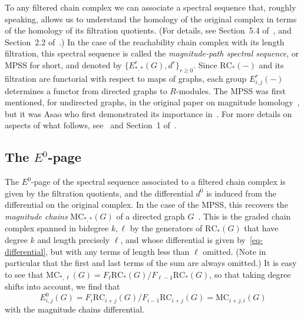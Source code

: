 \documentclass[a4paper, 11 pt, oneside, reqno]{amsart}
\numberwithin{lemma}{section}
\theoremstyle{definition}
\newcommand{\RC}{\mathrm{RC}}
\newcommand{\MC}{\mathrm{MC}}
\begin{document}
To any filtered chain complex we can associate a spectral
sequence that, roughly speaking, allows us to understand the
homology of the original complex in terms of the homology
of its filtration quotients.
(For details, see Section~5.4 of~\cite{Weibel}, 
and Section~2.2 of~\cite{McCleary}.)
In the case of the reachability chain complex with its length
filtration, this spectral sequence
is called the \emph{magnitude-path spectral sequence},
or MPSS for short, and denoted by
$\{E^r_{\ast,\ast}(G),d^r\}_{r\geq 0}$.
Since $\RC_\ast(-)$ and its filtration are functorial with respect
to maps of graphs, each group $E^r_{i,j}(-)$ determines a functor
from directed graphs to $R$-modules.
The MPSS was first mentioned, for undirected graphs,
in the original paper on magnitude 
homology~\cite[Remark~8.7]{HepworthWillerton2017},
but it was Asao who first demonstrated its importance
in~\cite{Asao-path}.
For more details on aspects of what follows, see~\cite{Asao-path} and Section~1 of~\cite{DIMZ}.

\subsection{The $E^0$-page}\label{subsection-E0}
The $E^0$-page of the spectral sequence associated to a filtered chain complex
is given by the filtration quotients, and the differential $d^0$
is induced from the differential on the original complex.
In the case of the MPSS, this recovers the \emph{magnitude chains}
$\MC_{\ast,\ast}(G)$ of a directed graph $G$~\cite{HepworthWillerton2017}.
This is the graded chain complex spanned in
bidegree $k,\ell$ by the generators of $\RC_\ast(G)$ that have 
degree $k$ and length precisely $\ell$, and whose differential
is given by~\eqref{eq-differential}, but with
any terms of length less than $\ell$ omitted.
(Note in particular that the first and last
terms of the sum are always omitted.)
It is easy to see that 
$\MC_{\ast,\ell}(G)=F_\ell\RC_\ast(G)/F_{\ell-1}\RC_\ast(G)$,
so that taking degree shifts into account, we find that
\[
    E^0_{i,j}(G)
    = F_i\RC_{i+j}(G) / F_{i-1}\RC_{i+j}(G)
    =\MC_{i+j,i}(G)
\]
with the magnitude chains differential.
\end{document}
